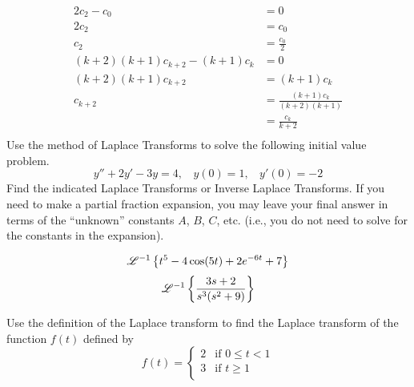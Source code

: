 \documentclass[exam=2]{math252exam}
\begin{document}
\begin{problems}
{\begin{equation*}
\begin{aligned}
	\end{aligned}
	\end{equation*}\begin{equation*}
	\begin{aligned}
		2c_{2} - c_{0} &= 0\\
		2c_{2} &= c_{0}\\
		c_{2} &= \frac{c_{0}}{2}\\
		(k+2)(k+1)c_{k+2} - (k+1)c_{k} &= 0\\
		(k+2)(k+1)c_{k+2} &= (k+1)c_{k}\\
		c_{k+2} &= \frac{(k+1)c_{k}}{(k+2)(k+1)}\\
				&= \frac{c_{k}}{k+2}\\
	\end{aligned}
	\end{equation*}}
	\problem Use the method of Laplace Transforms to solve the following initial value problem. \[ y'' + 2y' - 3y = 4,\ \ \ \ y(0)=1,\ \ \ \ y'(0)=-2 \]
	\problem Find the indicated Laplace Transforms or Inverse Laplace Transforms. If you need to make a partial fraction expansion, you may leave your final answer in terms of the ``unknown'' constants $A$, $B$, $C$, etc. (i.e., you do not need to solve for the constants in the expansion).
	\begin{problems}
		\subproblem \[ \mathscr{L}^{-1}\left\{ t^{5} - 4\cos(5t) + 2e^{-6t} + 7 \right\} \]
		\subproblem \[ \mathscr{L}^{-1}\left\{ \frac{3s+2}{s^{3}(s^{2} + 9)} \right\} \]
	\end{problems}
	\problem Use the definition of the Laplace transform to find the Laplace transform of the function $f(t)$ defined by \[ f(t) = \left\{ \begin{array}{cl}
		2 & \mbox{if } 0 \leq t < 1\\
		3 & \mbox{if } t \geq 1\\
	\end{array} \right. \] 
\end{problems}
\end{document}
